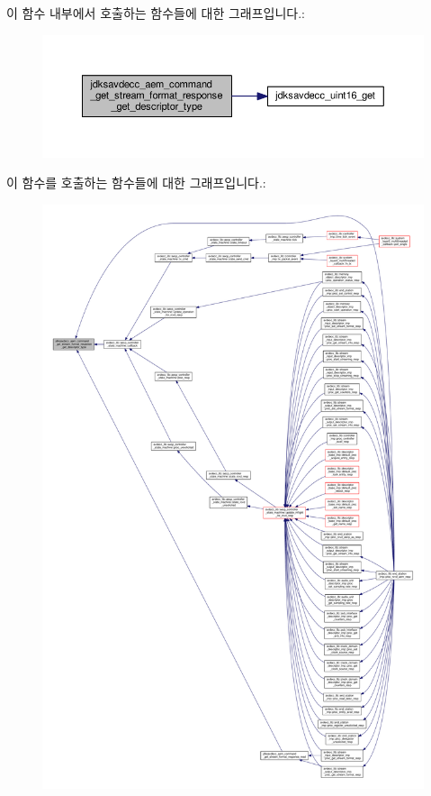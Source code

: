 이 함수 내부에서 호출하는 함수들에 대한 그래프입니다.\+:
\nopagebreak
\begin{figure}[H]
\begin{center}
\leavevmode
\includegraphics[width=350pt]{group__command__get__stream__format__response_ga241be5e90082adf05f17e1139bc77bc4_cgraph}
\end{center}
\end{figure}




이 함수를 호출하는 함수들에 대한 그래프입니다.\+:
\nopagebreak
\begin{figure}[H]
\begin{center}
\leavevmode
\includegraphics[width=350pt]{group__command__get__stream__format__response_ga241be5e90082adf05f17e1139bc77bc4_icgraph}
\end{center}
\end{figure}


